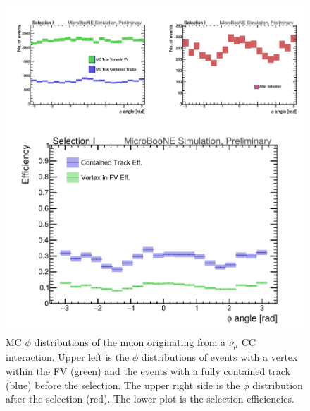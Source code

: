 \begin{figure}[htp!]
\includegraphics[width=\textwidth]{figs/truth_muphi.png}
\caption{MC $\phi$ distributions of the muon originating from a $\nu_{\mu}$ CC interaction. Upper left is the $\phi$ distributions of events with a vertex within the FV (green) and the events with a fully contained track (blue) before the selection. The upper right side is the $\phi$ distribution after the selection (red). The lower plot is the selection efficiencies.}
\label{fig:angle}
\end{figure}

